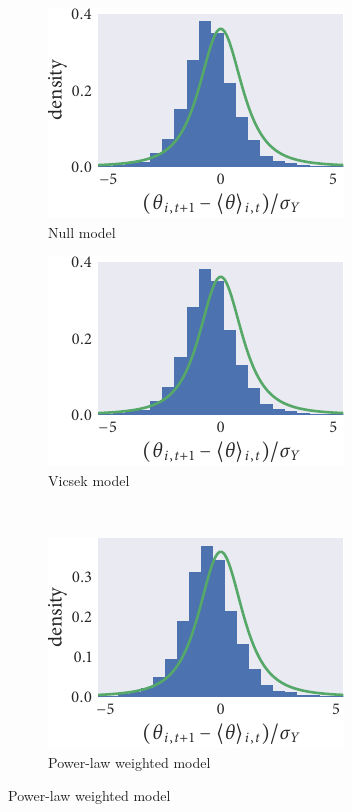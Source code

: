 \begin{figure}
  \begin{subfigure}[b]{0.33333\textwidth}
    \caption{Null model}
    \includegraphics{seq3/null_residuals.pdf}
  \end{subfigure}\hspace{2pt}
  \begin{subfigure}[b]{0.33333\textwidth}
    \caption{Vicsek model}
    \includegraphics{seq3/r_residuals.pdf}
  \end{subfigure}\vspace{1em}\\
  \begin{subfigure}[b]{0.33333\textwidth}
    \includegraphics{seq3/power_residuals.pdf}
    \caption{Power-law weighted model}

\end{subfigure}
\end{figure}
